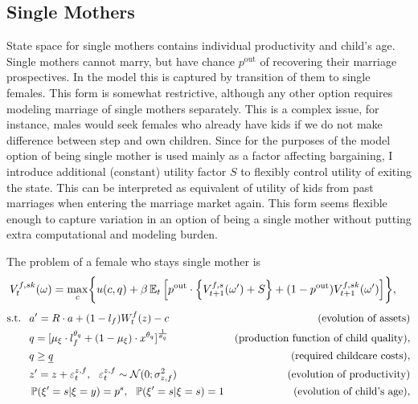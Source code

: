 \subsection{Single Mothers}
State space for single mothers contains individual productivity and child's age. Single mothers cannot marry, but have chance $p^{\text{out}}$ of recovering their marriage prospectives. In the model this is captured by transition of them to single females. This form is somewhat restrictive, although any other option requires modeling marriage of single mothers separately. This is a complex issue, for instance, males would seek females who already have kids if we do not make difference between step and own children. Since for the purposes of the model option of being single mother is used mainly as a factor affecting bargaining, I introduce additional (constant) utility factor $S$ to flexibly control utility of exiting the state. This can be interpreted as equivalent of utility of kids from past marriages when entering the marriage market again. This form seems flexible enough to capture variation in an option of being a single mother without putting extra computational and modeling burden.

The problem of a female who stays single mother is
\begin{align}V^{f,sk}_t(\omega) = \max\limits_{c} & \bigg\{ u(c,q) + \beta \E_t \Big[ p^{\text{out}} \cdot \left\{ V^{f,s}_{t+1}(\omega') + S\right\} +(1-p^{\text{out}})V^{f,sk}_{t+1}(\omega') \Big]  \bigg\},
\end{align}\vspace{-1em}
\begin{align*}
 \text{s.t. \ }  &  a' = R\cdot a  + (1-l_f)W^f_t(z) - c  & \text{ (evolution of assets)}\\
 & q = [\mu_\xi\cdot l_f^{\theta_q} + (1-\mu_\xi)\cdot x^{\theta_q}]^{\frac1{\theta_q}} & \text{(production function of child quality)},\\
& q \geq \underline{q} & \text{(required childcare costs)},\\
 &  z' = z + \varepsilon^{z,f}_t, \ \ \varepsilon^{z,f}_t \sim \mathcal{N}(0;\sigma_{z,f}^2) &  \text{ (evolution of productivity)}\\
 &  \P(\xi' = s | \xi = y) = p^s, \ \ \P(\xi' = s | \xi = s) = 1 & \text{(evolution of child's age)},\\
\end{align*}


